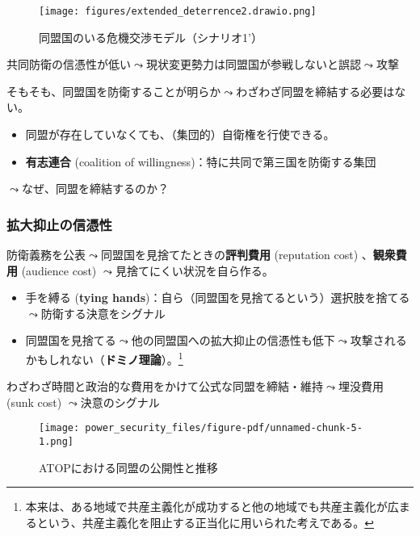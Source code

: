 \documentclass[
  xelatex,
  ja=standard]{bxjsarticle}
\providecommand{\tightlist}{%
  \setlength{\itemsep}{0pt}\setlength{\parskip}{0pt}}\usepackage{longtable,booktabs,array}
\begin{document}
\begin{figure}[htpb]

{\centering \texttt{[image: figures/extended\_deterrence2.drawio.png]}

}

\caption{同盟国のいる危機交渉モデル（シナリオ1'）}

\end{figure}

共同防衛の信憑性が低い\(\leadsto\)現状変更勢力は同盟国が参戦しないと誤認\(\leadsto\)攻撃

そもそも、同盟国を防衛することが明らか\(\leadsto\)わざわざ同盟を締結する必要はない。

\begin{itemize}
\tightlist
\item
  同盟が存在していなくても、（集団的）自衛権を行使できる。
\item
  \textbf{有志連合} (coalition of
  willingness)：特に共同で第三国を防衛する集団
\end{itemize}

\(\leadsto\)なぜ、同盟を締結するのか？

\hypertarget{ux62e1ux5927ux6291ux6b62ux306eux4fe1ux6191ux6027}{%
\subsubsection{拡大抑止の信憑性}\label{ux62e1ux5927ux6291ux6b62ux306eux4fe1ux6191ux6027}}

防衛義務を公表\(\leadsto\)同盟国を見捨てたときの\textbf{評判費用}
(reputation cost) 、\textbf{観衆費用} (audience cost)
\(\leadsto\)見捨てにくい状況を自ら作る\citep{fearon1997}。

\begin{itemize}
\tightlist
\item
  手を縛る (\textbf{tying
  hands})：自ら（同盟国を見捨てるという）選択肢を捨てる\(\leadsto\)防衛する決意をシグナル
\item
  同盟国を見捨てる\(\leadsto\)他の同盟国への拡大抑止の信憑性も低下\(\leadsto\)攻撃されるかもしれない（\textbf{ドミノ理論}）。\footnote{本来は、ある地域で共産主義化が成功すると他の地域でも共産主義化が広まるという、共産主義化を阻止する正当化に用いられた考えである。}
\end{itemize}

わざわざ時間と政治的な費用をかけて公式な同盟を締結・維持\(\leadsto\)埋没費用
(sunk cost) \(\leadsto\)決意のシグナル

\begin{figure}[htpb]

{\centering \texttt{[image: power\_security\_files/figure-pdf/unnamed-chunk-5-1.png]}

}

\caption{ATOPにおける同盟の公開性と推移}

\end{figure}
\end{document}
